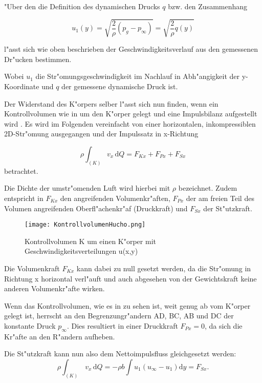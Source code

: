 "Uber den die Definition des dynamischen Drucks $q$ bzw. den Zusammenhang
	\begin{center}
	\begin{equation}
	\label{geschwindigkeitsformel}
		u_{1}(y)= \sqrt{\frac{2}{\rho}(p_g - p_{\infty}) } = \sqrt{\frac{2}{\rho} q(y)}
	\end{equation}
	\end{center}
l"asst sich wie oben beschrieben der Geschwindigkeitsverlauf aus den gemessenen Dr"ucken bestimmen.

Wobei $u_{1}$ die Str"omungsgeschwindigkeit im Nachlauf in Abh"angigkeit der y-Koordinate und $q$ der gemessene dynamische Druck ist.

Der Widerstand des K"orpers selber l"asst sich nun finden, wenn ein Kontrollvolumen wie in  um den K"orper gelegt und eine Impulsbilanz aufgestellt wird \cite{Hucho.2011}. Es wird im Folgenden vereinfacht von einer horizontalen, inkompressiblen 2D-Str"omung ausgegangen und der Impulssatz in x-Richtung

	\begin{equation}
	\label{eq:impulssatz_allg}
		\rho \int_{(K)} v_x \, \mathrm{d}Q = F_{Kx} + F_{Px} + F_{Sx}
	\end{equation}
betrachtet.

Die Dichte der umstr"omenden Luft wird hierbei mit $\rho$ bezeichnet.
Zudem entspricht in  $F_{Kx}$ den angreifenden Volumenkr"aften, $F_{Px}$ der am freien Teil des Volumen angreifenden Oberfl"achenkr"af (Druckkraft) und $F_{Sx}$ der St"utzkraft.

\begin{figure}[h]
	\centering
	\texttt{[image: KontrollvolumenHucho.png]}
	\caption{Kontrollvolumen K um einen K"orper mit Geschwindigkeitsverteilungen u(x,y) \cite{Hucho.2011}}
	\label{fig:HuchoKV}
\end{figure}

Die Volumenkraft $F_{Kx}$ kann dabei zu null gesetzt werden, da die Str"omung in Richtung x horizontal verl"auft und auch abgesehen von der Gewichtskraft keine anderen Volumenkr"afte wirken.

Wenn das Kontrollvolumen, wie es in  zu sehen ist, weit genug ab vom K"orper gelegt ist, herrscht an den Begrenzungr"andern AD, BC, AB und DC der konstante Druck $p_{\infty}$.
Dies resultiert in einer Druckkraft $F_{Px} = 0$, da sich die Kr"afte an den R"andern aufheben.

Die St"utzkraft kann nun also dem Nettoimpulsfluss gleichgesetzt werden:
	\begin{equation}
	\label{eq:nettoimpulsfluss}
		\rho \int_{(K)} \, v_x \, \mathrm{d}Q	= -\rho b \int u_1(u_{\infty} - u_1) \mathrm{d}y = F_{Sx}.	
	\end{equation}
	
